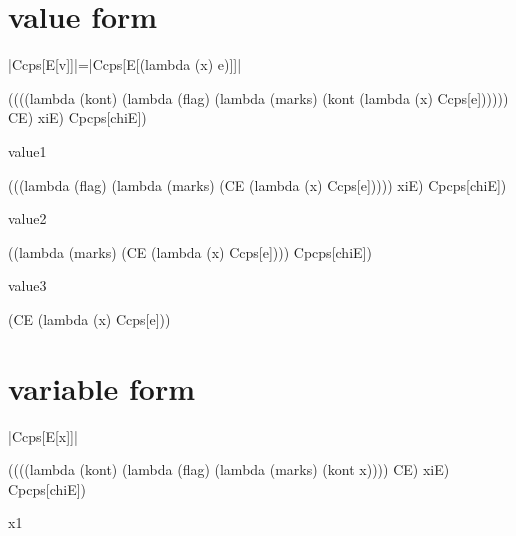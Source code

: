 \section{value form}

\noindent
\scheme|Ccps[E[v]]|=\scheme|Ccps[E[(lambda (x) e)]]|

\begin{schemeblock}
\begin{schemedisplay}
((((lambda (kont)
     (lambda (flag)
       (lambda (marks)
         (kont (lambda (x) Ccps[e])))))
   CE) xiE) Cpcps[chiE])
\end{schemedisplay}
\end{schemeblock}

\noindent
value1

\begin{schemeblock}
\begin{schemedisplay}
(((lambda (flag)
    (lambda (marks)
      (CE (lambda (x) Ccps[e]))))
  xiE) Cpcps[chiE])
\end{schemedisplay}
\end{schemeblock}

\noindent
value2

\begin{schemeblock}
\begin{schemedisplay}
((lambda (marks)
   (CE (lambda (x) Ccps[e])))
 Cpcps[chiE])
\end{schemedisplay}
\end{schemeblock}

\noindent
value3

\begin{schemeblock}
\begin{schemedisplay}
(CE (lambda (x) Ccps[e]))
\end{schemedisplay}
\end{schemeblock}

\section{variable form}

\noindent
\scheme|Ccps[E[x]]|
\begin{schemeblock}
\begin{schemedisplay}
((((lambda (kont)
     (lambda (flag)
       (lambda (marks)
         (kont x))))
   CE) xiE) Cpcps[chiE])
\end{schemedisplay}
\end{schemeblock}

\noindent
x1

